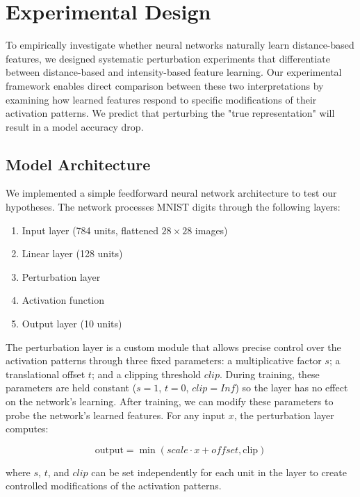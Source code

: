 \section{Experimental Design}

To empirically investigate whether neural networks naturally learn distance-based features, we designed systematic perturbation experiments that differentiate between distance-based and intensity-based feature learning. Our experimental framework enables direct comparison between these two interpretations by examining how learned features respond to specific modifications of their activation patterns. We predict that perturbing the "true representation" will result in a model accuracy drop.

\subsection{Model Architecture}
We implemented a simple feedforward neural network architecture to test our hypotheses. The network processes MNIST digits through the following layers:
\begin{enumerate}
    \item Input layer (784 units, flattened $28 \times 28$ images)
    \item Linear layer (128 units)
    \item Perturbation layer
    \item Activation function
    \item Output layer (10 units)
\end{enumerate}

The perturbation layer is a custom module that allows precise control over the activation patterns through three fixed parameters: a multiplicative factor $s$; a translational offset $t$; and a clipping threshold $clip$. During training, these parameters are held constant ($s=1$, $t=0$, $clip=Inf$) so the layer has no effect on the network's learning. After training, we can modify these parameters to probe the network's learned features. For any input $x$, the perturbation layer computes:

\begin{equation}
    \text{output} = \min(scale \cdot x + offset, \text{clip})
\end{equation}

where $s$, $t$, and $clip$ can be set independently for each unit in the layer to create controlled modifications of the activation patterns.


